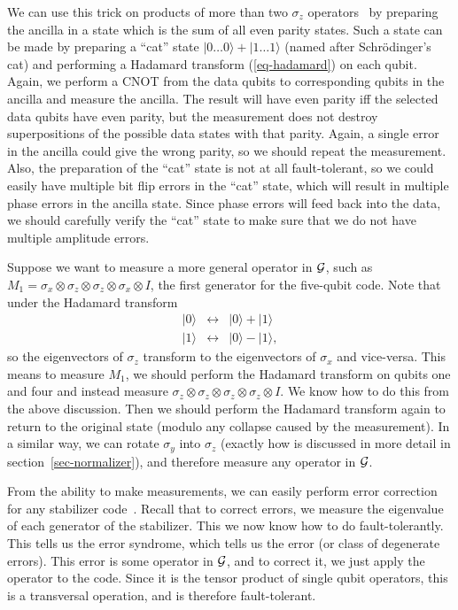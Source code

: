 \documentclass{report}
\newcommand{\G}{{\cal G}}
\newcommand{\ket}[1]{|{#1}\rangle}
\newcommand{\X}{\sigma_x}
\newcommand{\Z}{\sigma_z}
\newcommand{\Y}{\sigma_y}
\begin{document}
We can use this trick on products of more than two $\Z$ 
operators~\cite{shor-fault-tol} by preparing the ancilla in a state which is 
the sum of all even parity states.  Such a state can be made by preparing a 
``cat'' state $\ket{0 \ldots 0} + \ket{1 \ldots 1}$ (named after 
Schr\"odinger's cat) and performing a Hadamard transform 
(\ref{eq-hadamard}) on each qubit.  Again, we perform a CNOT from the 
data qubits to corresponding qubits in the ancilla and measure the ancilla.  
The result will have even parity iff the selected data qubits have even 
parity, but the measurement does not destroy superpositions of the 
possible data states with that parity.  Again, a single error in the ancilla 
could give the wrong parity, so we should repeat the measurement.  Also, 
the preparation of the ``cat'' state is not at all fault-tolerant, so we could 
easily have multiple bit flip errors in the ``cat'' state, which will result 
in multiple phase errors in the ancilla state.  Since phase errors will feed 
back into the data, we should carefully verify the ``cat'' state to make sure 
that we do not have multiple amplitude errors.

Suppose we want to measure a more general operator in $\G$, such as 
$M_1 = \X \otimes\Z \otimes \Z \otimes \X \otimes I$, the first generator 
for the five-qubit code.  Note that under the Hadamard transform
\begin{eqnarray}
\ket{0} & \leftrightarrow & \ket{0} + \ket{1} \nonumber \\
\ket{1} & \leftrightarrow & \ket{0} - \ket{1},
\end{eqnarray}
so the eigenvectors of $\Z$ transform to the eigenvectors of $\X$ and 
vice-versa.  This means to measure $M_1$, we should perform the 
Hadamard transform on qubits one and four and instead measure $\Z 
\otimes \Z \otimes \Z \otimes \Z \otimes I$.  We know how to do this from 
the above discussion.  Then we should perform the Hadamard transform 
again to return to the original state (modulo any collapse caused by the 
measurement).  In a similar way, we can rotate $\Y$ into $\Z$ (exactly 
how is discussed in more detail in section~\ref{sec-normalizer}), and 
therefore measure any operator in $\G$.

From the ability to make measurements, we can easily perform error 
correction for any stabilizer code~\cite{divincenzo}.  Recall that to correct 
errors, we measure the eigenvalue of each generator of the stabilizer.  This 
we now know how to do fault-tolerantly.  This tells us the error syndrome, 
which tells us the error (or class of degenerate errors).  This error is some 
operator in $\G$, and to correct it, we just apply the operator to the code.  
Since it is the tensor product of single qubit operators, this is a transversal 
operation, and is therefore fault-tolerant.
\end{document}
